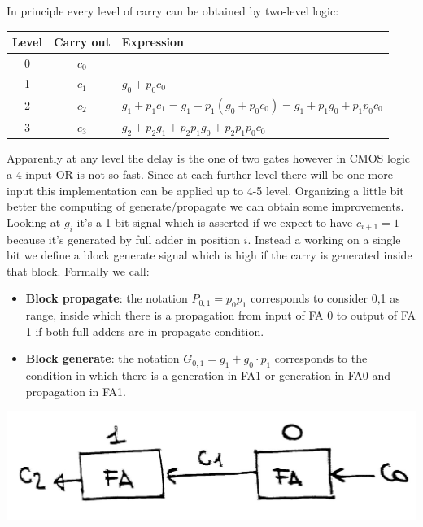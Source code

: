 In principle every level of carry can be obtained by two-level logic:

\begin{center}
  \begin{tabular}{|c|c|l|}
    \hline
    Level& Carry out& Expression\\
    \hline
     0&   $c_0$&  \\
    1&    $c_1$& $g_0+p_0c_0$\\
    2&    $c_2$& $g_1+p_1c_1=g_1+p_1(g_0+p_0c_0)=g_1+p_1g_0+p_1p_0c_0$\\
    3&    $c_3$& $g_2+p_2g_1+p_2p_1g_0+p_2p_1p_0c_0$\\
    \hline
  \end{tabular}
\end{center}

Apparently at any level the delay is the one of two gates however in CMOS logic a 4-input OR is not so fast. Since at each further level there will be one more input this implementation can be applied up to 4-5 level. Organizing a little bit better the computing of generate/propagate we can obtain some improvements.\\

Looking at $g_i$ it's a 1 bit signal which is asserted if we expect to have $c_{i+1}=1$ because it's generated by full adder in position $i$. Instead a working on a single bit we define a block generate signal which is high if the carry is generated inside that block. Formally we call:

\begin{itemize}
  \item \textbf{Block propagate}: the notation $P_{0,1}=p_0p_1$ corresponds to consider {0,1} as range, inside which there is a propagation from input of FA 0 to output of FA 1 if both full adders are in propagate condition.
  \item \textbf{Block generate}: the notation $G_{0,1}=g_1+g_0 \cdot p_1$ corresponds to the condition in which there is a generation in FA1 or generation in FA0 and propagation in FA1.
\end{itemize}

\begin{center}
  \includegraphics[width=0.6\linewidth]{img/img2/11}
\end{center}


